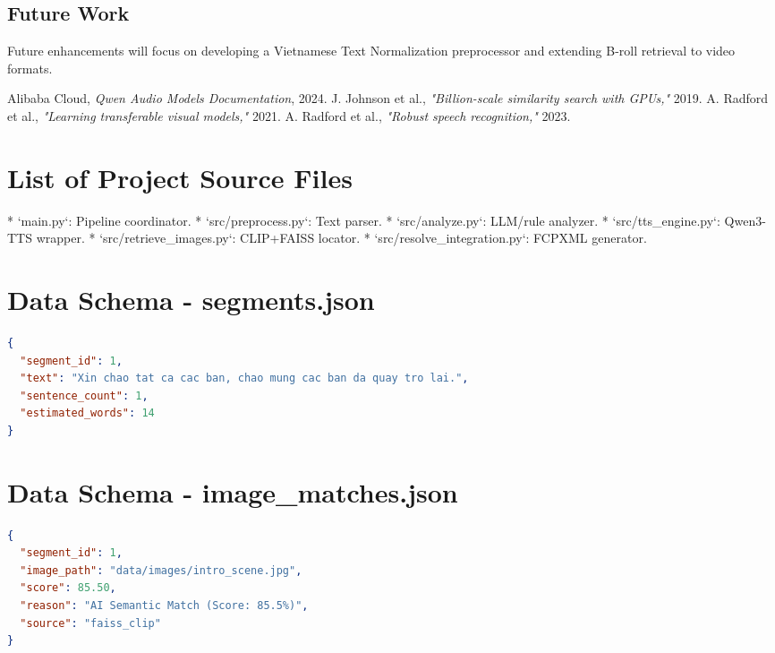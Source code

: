 \documentclass[a4paper,12pt]{report}
\begin{document}
\section{Future Work}
Future enhancements will focus on developing a Vietnamese Text Normalization preprocessor and extending B-roll retrieval to video formats.

\newpage

\begin{thebibliography}{99}
 Alibaba Cloud, \textit{Qwen Audio Models Documentation}, 2024.
 J. Johnson et al., \textit{"Billion-scale similarity search with GPUs,"} 2019.
 A. Radford et al., \textit{"Learning transferable visual models,"} 2021.
 A. Radford et al., \textit{"Robust speech recognition,"} 2023.
\end{thebibliography}

\newpage

\appendix
\chapter{List of Project Source Files}
* `main.py`: Pipeline coordinator.
* `src/preprocess.py`: Text parser.
* `src/analyze.py`: LLM/rule analyzer.
* `src/tts_engine.py`: Qwen3-TTS wrapper.
* `src/retrieve_images.py`: CLIP+FAISS locator.
* `src/resolve_integration.py`: FCPXML generator.

\chapter{Data Schema - segments.json}
\begin{lstlisting}[language=JSON]
{
  "segment_id": 1,
  "text": "Xin chao tat ca cac ban, chao mung cac ban da quay tro lai.",
  "sentence_count": 1,
  "estimated_words": 14
}
\end{lstlisting}

\chapter{Data Schema - image\_matches.json}
\begin{lstlisting}[language=JSON]
{
  "segment_id": 1,
  "image_path": "data/images/intro_scene.jpg",
  "score": 85.50,
  "reason": "AI Semantic Match (Score: 85.5%)",
  "source": "faiss_clip"
}
\end{lstlisting}
\end{document}
